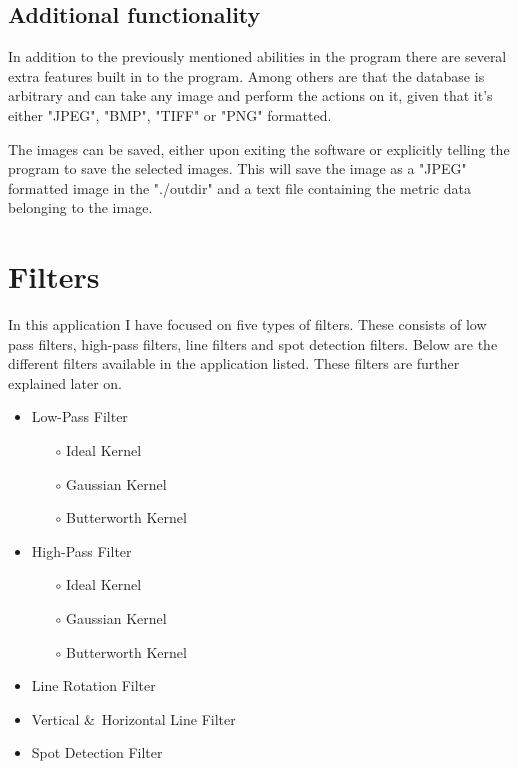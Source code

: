 \section{Additional functionality}
In addition to the previously mentioned abilities in the program there are
several extra features built in to the program.  Among others are that the
database is arbitrary and can take any image and perform the actions on it, 
given that it's either "JPEG", "BMP", "TIFF" or "PNG" formatted.

The images can be saved, either upon exiting the software or explicitly telling
the program to save the selected images.  This will save the image as a "JPEG"
formatted image in the "./outdir" and a text file containing the metric data
belonging to the image.




\chapter{Filters}
In this application I have focused on five types of filters. These consists of
low pass filters, high-pass filters, line filters and spot detection filters.
Below are the different filters available in the application listed. These
filters are further explained later on. 
\begin{multicols}{3}
\begin{itemize}
	\item Low-Pass Filter
	\begin{itemize}
		\item[$\circ$] Ideal Kernel
		\item[$\circ$] Gaussian Kernel
		\item[$\circ$] Butterworth Kernel
	\end{itemize}

	\item High-Pass Filter
	\begin{itemize}
		\item[$\circ$] Ideal Kernel
		\item[$\circ$] Gaussian Kernel
		\item[$\circ$] Butterworth Kernel
	\end{itemize}

	\item Line Rotation Filter
	\item Vertical \&\ Horizontal Line Filter
	\item Spot Detection Filter
\end{itemize}
\end{multicols}


